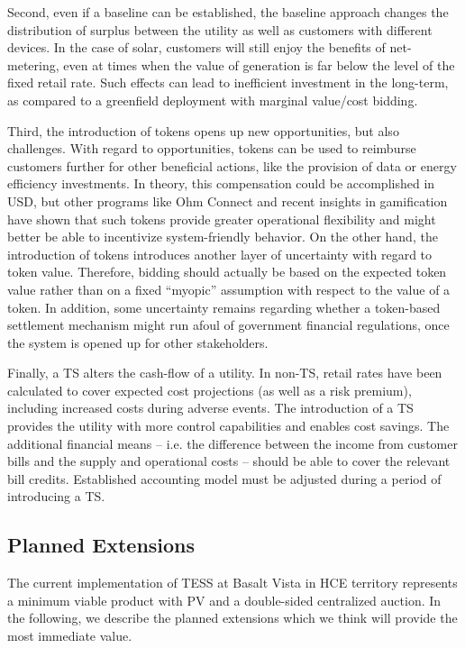 Second, even if a baseline can be established, the baseline approach changes the distribution of surplus between the utility as well as customers with different devices. In the case of solar, customers will still enjoy the benefits of net-metering, even at times when the value of generation is far below the level of the fixed retail rate. Such effects can lead to inefficient investment in the long-term, as compared to a greenfield deployment with marginal value/cost bidding.

Third, the introduction of tokens opens up new opportunities, but also challenges. 
With regard to opportunities, tokens can be used to reimburse customers further for other beneficial actions, like the provision of data or energy efficiency investments. In theory, this compensation could be accomplished in USD, but other programs like Ohm Connect \citep{OhmConnect2020} and recent insights in gamification have shown that such tokens provide greater operational flexibility and might better be able to incentivize system-friendly behavior.
On the other hand, the introduction of tokens introduces another layer of uncertainty with regard to token value. Therefore, bidding should actually be based on the expected token value rather than on a fixed ``myopic'' assumption with respect to the value of a token.
In addition, some uncertainty remains regarding whether a token-based settlement mechanism might run afoul of government financial regulations, once the system is opened up for other stakeholders.

Finally, a TS alters the cash-flow of a utility. In non-TS, retail rates have been calculated to cover expected cost projections (as well as a risk premium), including increased costs during adverse events. The introduction of a TS provides the utility with more control capabilities and enables cost savings. The additional financial means -- i.e. the difference between the income from customer bills and the supply and operational costs -- should be able to cover the relevant bill credits. 
Established accounting model must be adjusted during a period of introducing a TS.

\subsection{Planned Extensions}\label{sec:extensions}

The current implementation of TESS at Basalt Vista in HCE territory represents a minimum viable product with PV and a double-sided centralized auction. In the following, we describe the planned extensions which we think will provide the most immediate value.

